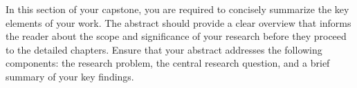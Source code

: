 In this section of your capstone, you are required to concisely summarize the key elements of your work. The abstract should provide a clear overview that informs the reader about the scope and significance of your research before they proceed to the detailed chapters. Ensure that your abstract addresses the following components: the research problem, the central research question, and a brief summary of your key findings.